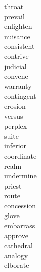 \documentclass[a4paper, 10pt]{ctexart}
\begin{document}
\begin{multicols*}{2}
\begin{description}
\item[throat]

\item[prevail]

\item[enlighten]

\item[nuisance]

\item[consistent]

\item[contrive]

\item[judicial]

\item[convene]

\item[warranty]

\item[contingent]

\item[erosion]

\item[versus]

\item[perplex]

\item[suite]

\item[inferior]

\item[coordinate]

\item[realm]

\item[undermine]

\item[priest]

\item[route]

\item[concession]

\item[glove]

\item[embarrass]

\item[approve]

\item[cathedral]

\item[analogy]

\item[elborate]


\end{description}
\end{multicols*}
\end{document}
